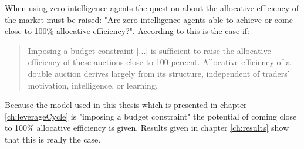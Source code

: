 \documentclass[../Bachelorarbeit.tex]{subfiles}
\begin{document}
\medskip
When using zero-intelligence agents the question about the \gls{allocative efficiency} of the market must be raised: "Are zero-intelligence agents able to achieve or come close to 100\% allocative efficiency?". According to \cite{GodeSunder1993} this is the case if:

\begin{quote}
Imposing a budget constraint [...] is sufficient to raise the allocative efficiency of these auctions close to 100 percent. Allocative efficiency of a double auction derives largely from its structure, independent of traders' motivation, intelligence, or learning.
\end{quote}

Because the model used in this thesis which is presented in chapter \ref{ch:leverageCycle} is "imposing a budget constraint" the potential of coming close to 100\% allocative efficiency is given. Results given in chapter \ref{ch:results} show that this is really the case.
\end{document}
